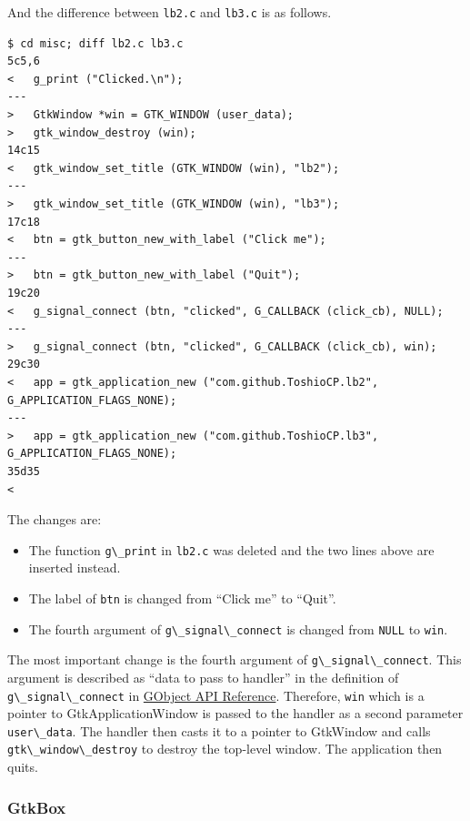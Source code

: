 And the difference between \passthrough{\lstinline!lb2.c!} and
\passthrough{\lstinline!lb3.c!} is as follows.

\begin{lstlisting}
$ cd misc; diff lb2.c lb3.c
5c5,6
<   g_print ("Clicked.\n");
---
>   GtkWindow *win = GTK_WINDOW (user_data);
>   gtk_window_destroy (win);
14c15
<   gtk_window_set_title (GTK_WINDOW (win), "lb2");
---
>   gtk_window_set_title (GTK_WINDOW (win), "lb3");
17c18
<   btn = gtk_button_new_with_label ("Click me");
---
>   btn = gtk_button_new_with_label ("Quit");
19c20
<   g_signal_connect (btn, "clicked", G_CALLBACK (click_cb), NULL);
---
>   g_signal_connect (btn, "clicked", G_CALLBACK (click_cb), win);
29c30
<   app = gtk_application_new ("com.github.ToshioCP.lb2", G_APPLICATION_FLAGS_NONE);
---
>   app = gtk_application_new ("com.github.ToshioCP.lb3", G_APPLICATION_FLAGS_NONE);
35d35
< 
\end{lstlisting}

The changes are:

\begin{itemize}
\tightlist
\item
  The function \passthrough{\lstinline!g\_print!} in
  \passthrough{\lstinline!lb2.c!} was deleted and the two lines above
  are inserted instead.
\item
  The label of \passthrough{\lstinline!btn!} is changed from ``Click
  me'' to ``Quit''.
\item
  The fourth argument of \passthrough{\lstinline!g\_signal\_connect!} is
  changed from \passthrough{\lstinline!NULL!} to
  \passthrough{\lstinline!win!}.
\end{itemize}

The most important change is the fourth argument of
\passthrough{\lstinline!g\_signal\_connect!}. This argument is described
as ``data to pass to handler'' in the definition of
\passthrough{\lstinline!g\_signal\_connect!} in
\href{https://docs.gtk.org/gobject/func.signal_connect.html}{GObject API
Reference}. Therefore, \passthrough{\lstinline!win!} which is a pointer
to GtkApplicationWindow is passed to the handler as a second parameter
\passthrough{\lstinline!user\_data!}. The handler then casts it to a
pointer to GtkWindow and calls
\passthrough{\lstinline!gtk\_window\_destroy!} to destroy the top-level
window. The application then quits.

\hypertarget{gtkbox}{%
\subsubsection{GtkBox}\label{gtkbox}}

